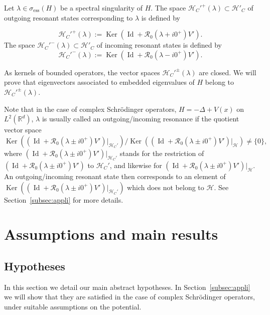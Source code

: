 \documentclass[AHL,Unicode,longabstracts,published]{cedram}
\newcommand{\Hi}{\mathcal{H}}
\newcommand{\R}{\mathbb{R}}
\newcommand{\ess}{\mathrm{ess}}
\newcommand{\Res}{\mathcal{R}}
\DeclareMathOperator{\Ker}{Ker}
\DeclareMathOperator{\Id}{Id}
\newcommand{\Hi}{\mathcal{H}}
\newcommand{\R}{\mathbb{R}}
\newcommand{\ess}{\mathrm{ess}}
\begin{document}
\begin{defi}\label{def:resonant}
Let $\lambda\in\sigma_\ess(H)$ be a spectral singularity of $H$. The space $\Hi_C'^+(\lambda)\subset\Hi'_C$ of outgoing resonant states corresponding to $\lambda$ is defined by

\begin{equation*}
\Hi_C'^+(\lambda):=\Ker\left(\Id+\Res_0(\lambda+i0^+)V'\right).
\end{equation*}
The space $\Hi_C'^-(\lambda)\subset\Hi'_C$ of incoming resonant states is defined by
\begin{equation*}
\Hi_C'^-(\lambda):=\Ker\left(\Id+\Res_0(\lambda-i0^+)V'\right).
\end{equation*}
\end{defi}

As kernels of bounded operators, the vector spaces $\Hi_C'^{\pm}(\lambda)$ are closed. We will prove that eigenvectors associated to embedded eigenvalues of $H$ belong to $\Hi_C'^\pm(\lambda)$.

Note that in the case of complex Schr\"odinger operators, $H=-\Delta+V(x)$ on $L^2(\R^d)$, $\lambda$ is usually called an outgoing/incoming resonance if the quotient vector space
\begin{equation*}
\Ker\left(\left(\Id+\Res_0(\lambda\pm i0^+)V'\right)|_{\Hi_C'}\right)\slash \Ker\left(\left(\Id+\Res_0(\lambda\pm i0^+)V'\right)|_{\Hi}\right)\neq\lbrace 0\rbrace,
\end{equation*}
where $(\Id+\Res_0(\lambda\pm i0^+)V')|_{\Hi_C'}$ stands for the restriction of $(\Id+\Res_0(\lambda\pm i0^+)V')$ to $\Hi_C'$, and likewise for $(\Id+\Res_0(\lambda\pm i0^+)V')|_{\Hi}$. An outgoing/incoming resonant state then corresponds to an element of $\Ker((\Id+\Res_0(\lambda\pm i0^+)V')|_{\Hi_C'})$ which does not belong to $\Hi$. See Section~\ref{subsec:appli} for more details.



\section{Assumptions and main results}\label{sec:results}

\subsection{Hypotheses}
In this section we detail our main abstract hypotheses. In Section~\ref{subsec:appli} we will show that they are satisfied in the case of complex Schr\"odinger operators, under suitable assumptions on the potential.
\end{document}

